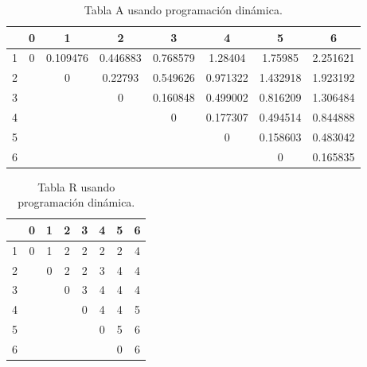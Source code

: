 \documentclass[a4paper]{article}
\begin{document}
\begin{table}[H]
\centering
\relax
\begin{tabular}{|c|c|c|c|c|c|c|c|}
\hline
 & 0\cellcolor{blue!20} & 1\cellcolor{blue!20} & 2\cellcolor{blue!20} & 3\cellcolor{blue!20} & 4\cellcolor{blue!20} & 5\cellcolor{blue!20} & 6\cellcolor{blue!20} \\
\hline
1\cellcolor{blue!20} & 0 & 0.109476 & 0.446883 & 0.768579 & 1.28404 & 1.75985 & 2.251621 \\
\hline
2\cellcolor{blue!20} &  & 0 & 0.22793 & 0.549626 & 0.971322 & 1.432918 & 1.923192 \\
\hline
3\cellcolor{blue!20} &  &  & 0 & 0.160848 & 0.499002 & 0.816209 & 1.306484 \\
\hline
4\cellcolor{blue!20} &  &  &  & 0 & 0.177307 & 0.494514 & 0.844888 \\
\hline
5\cellcolor{blue!20} &  &  &  &  & 0 & 0.158603 & 0.483042 \\
\hline
6\cellcolor{blue!20} &  &  &  &  &  & 0 & 0.165835 \\
\hline
\end{tabular}
\caption{Tabla A usando programación dinámica.}
\end{table}


\begin{table}[H]
\centering
\relax
\begin{tabular}{|c|c|c|c|c|c|c|c|}
\hline
 & 0\cellcolor{blue!20} & 1\cellcolor{blue!20} & 2\cellcolor{blue!20} & 3\cellcolor{blue!20} & 4\cellcolor{blue!20} & 5\cellcolor{blue!20} & 6\cellcolor{blue!20} \\
\hline
1\cellcolor{blue!20} & 0 & 1 & 2 & 2 & 2 & 2 & 4 \\
\hline
2\cellcolor{blue!20} &  & 0 & 2 & 2 & 3 & 4 & 4 \\
\hline
3\cellcolor{blue!20} &  &  & 0 & 3 & 4 & 4 & 4 \\
\hline
4\cellcolor{blue!20} &  &  &  & 0 & 4 & 4 & 5 \\
\hline
5\cellcolor{blue!20} &  &  &  &  & 0 & 5 & 6 \\
\hline
6\cellcolor{blue!20} &  &  &  &  &  & 0 & 6 \\
\hline
\end{tabular}
\caption{Tabla R usando programación dinámica.}
\end{table}
\begin{center}
\end{center}
\end{document}
